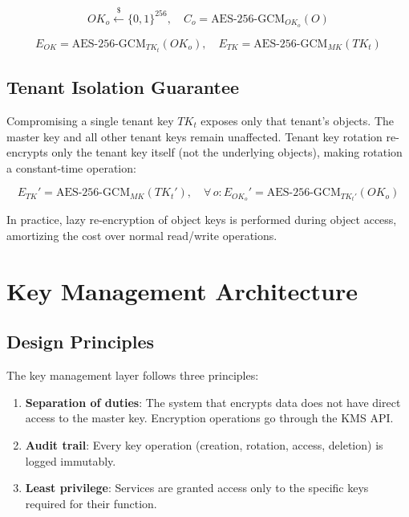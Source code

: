 \documentclass[11pt,a4paper]{article}
\begin{document}
\begin{equation}
    OK_o \xleftarrow{\$} \{0, 1\}^{256}, \quad C_o = \text{AES-256-GCM}_{OK_o}(O)
\end{equation}

\begin{equation}
    E_{OK} = \text{AES-256-GCM}_{TK_t}(OK_o), \quad E_{TK} = \text{AES-256-GCM}_{MK}(TK_t)
\end{equation}

\subsection{Tenant Isolation Guarantee}

Compromising a single tenant key $TK_t$ exposes only that tenant's objects. The master key and all other tenant keys remain unaffected. Tenant key rotation re-encrypts only the tenant key itself (not the underlying objects), making rotation a constant-time operation:

\begin{equation}
    E_{TK}' = \text{AES-256-GCM}_{MK}(TK_t'), \quad \forall\, o : E_{OK_o}' = \text{AES-256-GCM}_{TK_t'}(OK_o)
\end{equation}

In practice, lazy re-encryption of object keys is performed during object access, amortizing the cost over normal read/write operations.

\section{Key Management Architecture}

\subsection{Design Principles}

The key management layer follows three principles:

\begin{enumerate}
    \item \textbf{Separation of duties}: The system that encrypts data does not have direct access to the master key. Encryption operations go through the KMS API.
    \item \textbf{Audit trail}: Every key operation (creation, rotation, access, deletion) is logged immutably.
    \item \textbf{Least privilege}: Services are granted access only to the specific keys required for their function.
\end{enumerate}
\end{document}
